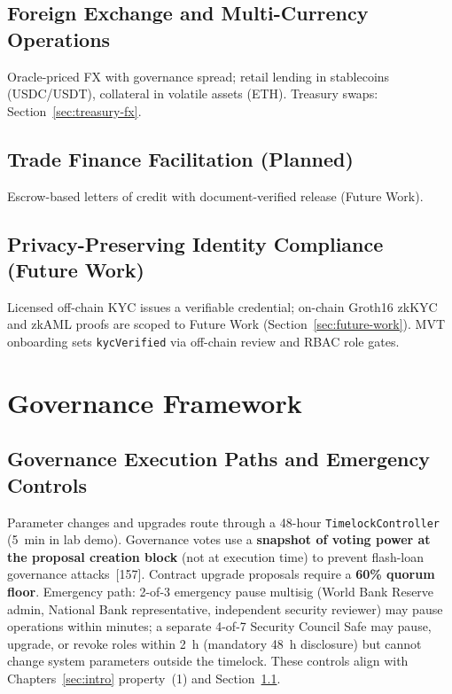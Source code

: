 \documentclass[12pt,a4paper]{report}
\begin{document}
\subsection{Foreign Exchange and Multi-Currency Operations}
Oracle-priced FX with governance spread; retail lending in stablecoins (USDC/USDT), collateral in volatile assets (ETH). Treasury swaps: Section~\ref{sec:treasury-fx}.

\subsection{Trade Finance Facilitation (Planned)}
Escrow-based letters of credit with document-verified release (Future Work).

\subsection{Privacy-Preserving Identity Compliance (Future Work)}
\label{sec:zkp-compliance}
Licensed off-chain KYC issues a verifiable credential; on-chain Groth16 zkKYC and zkAML proofs are scoped to Future Work (Section~\ref{sec:future-work}). MVT onboarding sets \texttt{kycVerified} via off-chain review and RBAC role gates.


\section{Governance Framework}
\label{sec:governance-framework}

\subsection{Governance Execution Paths and Emergency Controls}
\label{sec:governance-dual-path}

Parameter changes and upgrades route through a 48-hour \texttt{TimelockController} (5~min in lab demo). Governance votes use a \textbf{snapshot of voting power at the proposal creation block} (not at execution time) to prevent flash-loan governance attacks~[157]. Contract upgrade proposals require a \textbf{60\% quorum floor}. Emergency path: 2-of-3 emergency pause multisig (World Bank Reserve admin, National Bank representative, independent security reviewer) may pause operations within minutes; a separate 4-of-7 Security Council Safe may pause, upgrade, or revoke roles within 2~h (mandatory 48~h disclosure) but cannot change system parameters outside the timelock. These controls align with Chapters~\ref{sec:intro} property~(1) and Section~\ref{sec:governance-dual-path}.
\end{document}
